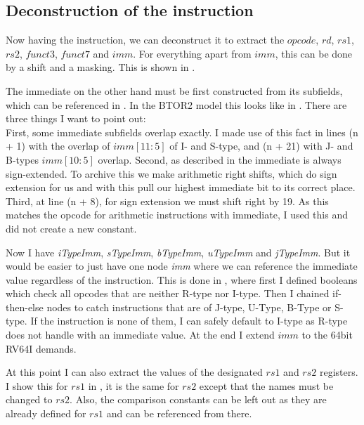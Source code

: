 \subsection{Deconstruction of the instruction}
Now having the instruction, we can deconstruct it to extract the
$opcode$, $rd$, $rs1$, $rs2$, $funct3$, $funct7$ and $imm$. For
everything apart from $imm$, this can be done by a shift and a
masking. This is shown in .

The immediate on the other hand must be first constructed from its
subfields, which can be referenced in . In
the BTOR2 model this looks like in .
 There are three things I
want to point out:\\ First, some immediate subfields overlap exactly.
I made use of this fact in lines (n + 1) with the overlap of
$imm[11:5]$ of I- and S-type, and (n + 21) with J- and B-types
$imm[10:5]$ overlap. Second, as described in 
the immediate is always sign-extended. To archive this we make
arithmetic right shifts, which do sign extension for us and with this
pull our highest immediate bit to its correct place. Third, at line
(n + 8), for sign extension we must shift right by 19. As this
matches the opcode for arithmetic instructions with immediate, I used
this and did not create a new constant.

Now I have \textsl{iTypeImm}, \textsl{sTypeImm}, \textsl{bTypeImm},
\textsl{uTypeImm} and \textsl{jTypeImm}. But it would be easier to
just have one node \textsl{imm} where we can reference the immediate
value regardless of the instruction. This is done in
, where first I defined booleans which check
all opcodes that are neither R-type nor I-type. Then I chained
if-then-else nodes to catch instructions that are of J-type, U-Type,
B-Type or S-type. If the instruction is none of them, I can safely
default to I-type as R-type does not handle with an immediate value.
At the end I extend $imm$ to the 64bit RV64I demands.

At this point I can also extract the values of the designated $rs1$
and $rs2$ registers. I show this for $rs1$ in
, it is the same for $rs2$ except that the
names must be changed to $rs2$. Also, the comparison constants can be
left out as they are already defined for $rs1$ and can be referenced
from there.






